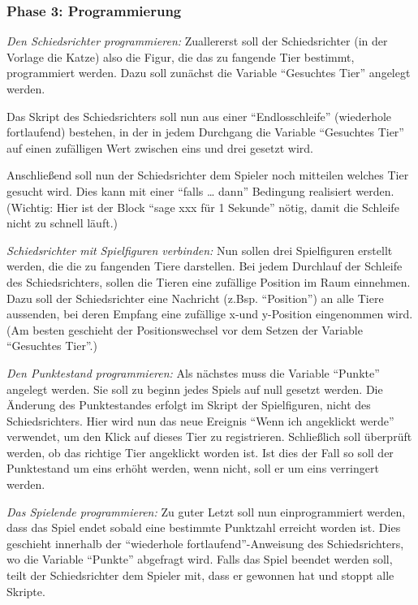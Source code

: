 \subsubsection{Phase 3: Programmierung}\label{phase-3-programmierung}

\emph{Den Schiedsrichter programmieren:} Zuallererst soll der
Schiedsrichter (in der Vorlage die Katze) also die Figur, die das zu
fangende Tier bestimmt, programmiert werden. Dazu soll zunächst die
Variable ``Gesuchtes Tier'' angelegt werden.

Das Skript des Schiedsrichters soll nun aus einer ``Endlosschleife''
(wiederhole fortlaufend) bestehen, in der in jedem Durchgang die
Variable ``Gesuchtes Tier'' auf einen zufälligen Wert zwischen eins und
drei gesetzt wird.

Anschließend soll nun der Schiedsrichter dem Spieler noch mitteilen
welches Tier gesucht wird. Dies kann mit einer ``falls \ldots{} dann''
Bedingung realisiert werden. (Wichtig: Hier ist der Block ``sage xxx für
1 Sekunde'' nötig, damit die Schleife nicht zu schnell läuft.)

\emph{Schiedsrichter mit Spielfiguren verbinden:} Nun sollen drei
Spielfiguren erstellt werden, die die zu fangenden Tiere darstellen. Bei
jedem Durchlauf der Schleife des Schiedsrichters, sollen die Tieren eine
zufällige Position im Raum einnehmen. Dazu soll der Schiedsrichter eine
Nachricht (z.Bsp. ``Position'') an alle Tiere aussenden, bei deren
Empfang eine zufällige x-und y-Position eingenommen wird. (Am besten
geschieht der Positionswechsel vor dem Setzen der Variable ``Gesuchtes
Tier''.)

\emph{Den Punktestand programmieren:} Als nächstes muss die Variable
``Punkte'' angelegt werden. Sie soll zu beginn jedes Spiels auf null
gesetzt werden. Die Änderung des Punktestandes erfolgt im Skript der
Spielfiguren, nicht des Schiedsrichters. Hier wird nun das neue Ereignis
``Wenn ich angeklickt werde'' verwendet, um den Klick auf dieses Tier zu
registrieren. Schließlich soll überprüft werden, ob das richtige Tier
angeklickt worden ist. Ist dies der Fall so soll der Punktestand um eins
erhöht werden, wenn nicht, soll er um eins verringert werden.

\emph{Das Spielende programmieren:} Zu guter Letzt soll nun
einprogrammiert werden, dass das Spiel endet sobald eine bestimmte
Punktzahl erreicht worden ist. Dies geschieht innerhalb der ``wiederhole
fortlaufend''-Anweisung des Schiedsrichters, wo die Variable ``Punkte''
abgefragt wird. Falls das Spiel beendet werden soll, teilt der
Schiedsrichter dem Spieler mit, dass er gewonnen hat und stoppt alle
Skripte.

